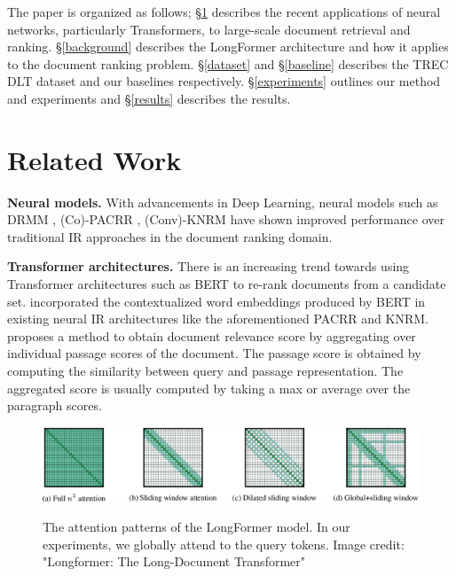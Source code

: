\documentclass[sigconf, nonacm=true]{acmart}
\begin{document}
The paper is organized as follows; \S \ref{related-work} describes the recent applications of neural networks, particularly Transformers, to large-scale document retrieval and ranking. \S \ref{background} describes the LongFormer architecture and how it applies to the document ranking problem. \S \ref{dataset} and \S \ref{baseline} describes the TREC DLT dataset and our baselines respectively. \S \ref{experiments} outlines our method and experiments and \S \ref{results} describes the results.

\section{Related Work} \label{related-work}

\textbf{Neural models.} With advancements in Deep Learning, neural models such as DRMM \cite{Guo2016ADR}, (Co)-PACRR \cite{Hui2017PACRRAP,Hui2018CoPACRRAC}, (Conv)-KNRM \cite{Xiong2017EndtoEndNA, Xiong2017ConvolutionalNN} have shown improved performance over traditional IR approaches in the document ranking domain.

\smallskip

\noindent \textbf{Transformer architectures.} There is an increasing trend towards using Transformer architectures \cite{Vaswani2017AttentionIA} such as BERT \cite{Devlin2019BERTPO} to re-rank documents from a candidate set. \citeauthor{MacAvaney2019CEDRCE} incorporated the contextualized word embeddings produced by BERT in existing neural IR architectures like the aforementioned PACRR and KNRM. \citeauthor{nogueira_passage_2020, yang_simple_2019} proposes a method to obtain document relevance score by aggregating over individual passage scores of the document. The passage score is obtained by computing the similarity between query and passage representation. The aggregated score is usually computed by taking a max or average over the paragraph scores.

\smallskip

\begin{figure}
  \caption{The attention patterns of the LongFormer model. In our experiments, we globally attend to the query tokens. Image credit: "Longformer: The Long-Document Transformer"}
  \includegraphics[width=\textwidth]{./images/longformer-attention.png}
  \label{fig:attention}
\end{figure}
\end{document}
